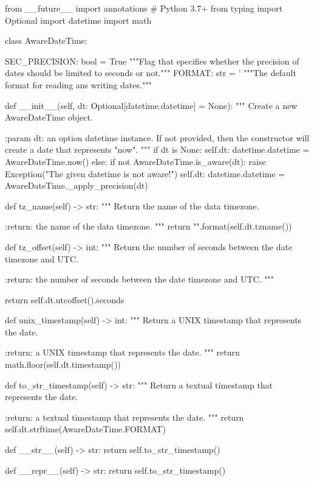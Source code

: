 \documentclass{article}
\begin{document}
    \begin{python}
from __future__ import annotations  # Python 3.7+
from typing import Optional
import datetime
import math


class AwareDateTime:

    SEC_PRECISION: bool = True
    """Flag that specifies whether the precision of dates should be limited to seconds or not."""
    FORMAT: str = '%
    """The default format for reading ans writing dates."""

    def __init__(self, dt: Optional[datetime.datetime] = None):
        """
        Create a new AwareDateTime object.

        :param dt: an option datetime instance. If not provided, then the constructor will
                   create a date that represents "now".
        """
        if dt is None:
            self.dt: datetime.datetime = AwareDateTime.now()
        else:
            if not AwareDateTime.is_aware(dt):
                raise Exception("The given datetime is not aware!")
            self.dt: datetime.datetime = AwareDateTime._apply_precision(dt)

    def tz_name(self) -> str:
        """
        Return the name of the data timezone.

        :return: the name of the data timezone.
        """
        return "{}".format(self.dt.tzname())

    def tz_offset(self) -> int:
        """
        Return the number of seconds between the date timezone and UTC.

        :return: the number of seconds between the date timezone and UTC.
        """

        return self.dt.utcoffset().seconds

    def unix_timestamp(self) -> int:
        """
        Return a UNIX timestamp that represents the date.

        :return: a UNIX timestamp that represents the date.
        """
        return math.floor(self.dt.timestamp())

    def to_str_timestamp(self) -> str:
        """
        Return a textual timestamp that represents the date.

        :return: a textual timestamp that represents the date.
        """
        return self.dt.strftime(AwareDateTime.FORMAT)

    def __str__(self) -> str:
        return self.to_str_timestamp()

    def __repr__(self) -> str:
        return self.to_str_timestamp()


\end{python}
\end{document}
